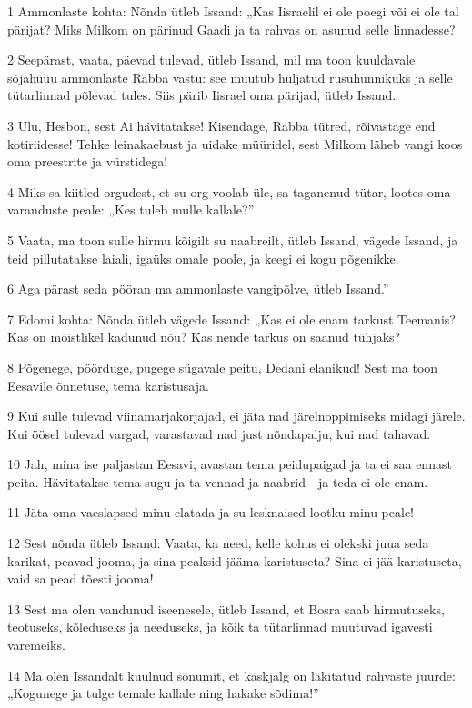\par 1 Ammonlaste kohta: Nõnda ütleb Issand: „Kas Iisraelil ei ole poegi või ei ole tal pärijat? Miks Milkom on pärinud Gaadi ja ta rahvas on asunud selle linnadesse?
\par 2 Seepärast, vaata, päevad tulevad, ütleb Issand, mil ma toon kuuldavale sõjahüüu ammonlaste Rabba vastu: see muutub hüljatud rusuhunnikuks ja selle tütarlinnad põlevad tules. Siis pärib Iisrael oma pärijad, ütleb Issand.
\par 3 Ulu, Hesbon, sest Ai hävitatakse! Kisendage, Rabba tütred, rõivastage end kotiriidesse! Tehke leinakaebust ja uidake müüridel, sest Milkom läheb vangi koos oma preestrite ja vürstidega!
\par 4 Miks sa kiitled orgudest, et su org voolab üle, sa taganenud tütar, lootes oma varanduste peale: „Kes tuleb mulle kallale?”
\par 5 Vaata, ma toon sulle hirmu kõigilt su naabreilt, ütleb Issand, vägede Issand, ja teid pillutatakse laiali, igaüks omale poole, ja keegi ei kogu põgenikke.
\par 6 Aga pärast seda pööran ma ammonlaste vangipõlve, ütleb Issand.”
\par 7 Edomi kohta: Nõnda ütleb vägede Issand: „Kas ei ole enam tarkust Teemanis? Kas on mõistlikel kadunud nõu? Kas nende tarkus on saanud tühjaks?
\par 8 Põgenege, pöörduge, pugege sügavale peitu, Dedani elanikud! Sest ma toon Eesavile õnnetuse, tema karistusaja.
\par 9 Kui sulle tulevad viinamarjakorjajad, ei jäta nad järelnoppimiseks midagi järele. Kui öösel tulevad vargad, varastavad nad just nõndapalju, kui nad tahavad.
\par 10 Jah, mina ise paljastan Eesavi, avastan tema peidupaigad ja ta ei saa ennast peita. Hävitatakse tema sugu ja ta vennad ja naabrid - ja teda ei ole enam.
\par 11 Jäta oma vaeslapsed minu elatada ja su lesknaised lootku minu peale!
\par 12 Sest nõnda ütleb Issand: Vaata, ka need, kelle kohus ei olekski juua seda karikat, peavad jooma, ja sina peaksid jääma karistuseta? Sina ei jää karistuseta, vaid sa pead tõesti jooma!
\par 13 Sest ma olen vandunud iseenesele, ütleb Issand, et Bosra saab hirmutuseks, teotuseks, kõleduseks ja needuseks, ja kõik ta tütarlinnad muutuvad igavesti varemeiks.
\par 14 Ma olen Issandalt kuulnud sõnumit, et käskjalg on läkitatud rahvaste juurde: „Kogunege ja tulge temale kallale ning hakake sõdima!”
